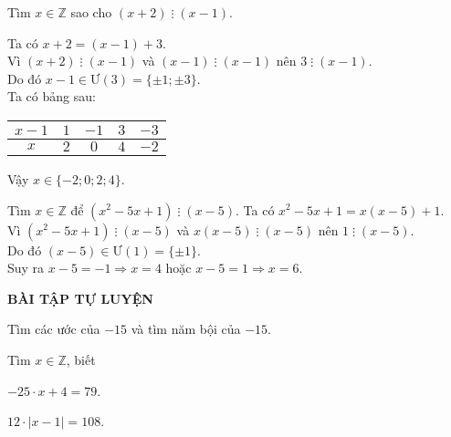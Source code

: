 \begin{vd}%
	Tìm $ x\in \mathbb{Z} $ sao cho $ (x+2) \;\vdots\;(x-1) $.	
	\loigiai
	{
		Ta có $ x+2=(x-1)+3 $.\\
		Vì $ (x+2) \;\vdots\;(x-1) $ và $ (x-1) \;\vdots\;(x-1) $ nên $ 3 \;\vdots\;(x-1) $.\\
		Do đó $ x-1 \in \mathrm{\text{Ư}}(3)=\{\pm 1; \pm 3\} $.\\
		Ta có bảng sau:
		\begin{center}
			\begin{tabular}{ |c|c|c|c|c| } 
				\hline
				$x-1$ & $1$ & $-1$ & $3$ & $-3$  \\ [1ex]
				\hline
				$x$ & $2$ & $0$ & $4$ & $-2$  \\ [1ex]
				\hline
			\end{tabular}
		\end{center}
	Vậy $ x\in \{-2; 0; 2; 4\} $.
	}
\end{vd}


\begin{vd}%
Tìm $ x\in \mathbb{Z} $ để $ (x^2-5x+1) \;\vdots \; (x-5) $.	
	\loigiai
	{
Ta có $ x^2-5x+1=x(x-5)+1 $.\\
Vì $ (x^2-5x+1) \;\vdots \; (x-5) $ và $ x(x-5) \;\vdots \; (x-5) $ nên $ 1 \;\vdots \; (x-5) $.\\
Do đó $ (x-5) \in \mathrm{\text{Ư}}(1)=\{\pm 1\} $.\\
Suy ra $ x-5=-1 \Rightarrow x=4 $ hoặc $ x-5=1 \Rightarrow x=6 $.
	}
\end{vd}


\begin{center}
\textbf{BÀI TẬP TỰ LUYỆN}
\end{center}

\begin{bt}%
Tìm các ước của $ -15 $ và tìm năm bội của $ -15 $.
\end{bt}

\begin{bt}%
Tìm $ x\in \mathbb{Z} $, biết
\begin{enumEX}{2}
	\item $ -25\cdot x+4=79 $.
	\item $ 12 \cdot |x-1|=108 $.
\end{enumEX}
\end{bt}

